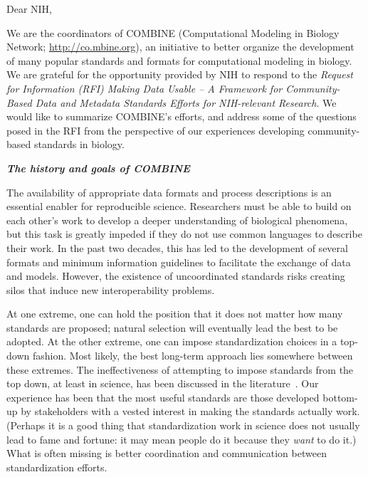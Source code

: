

\newcommand{\eg}{e.g.,\xspace}
\newcommand{\idorg}{\href{http://identifiers.org}{\texttt{Identifiers.org}}\xspace}


Dear NIH,

We are the coordinators of COMBINE (Computational Modeling in Biology Network; \url{http://co.mbine.org}), an initiative to better organize the development of many popular standards and formats for computational modeling in biology.  We are grateful for the opportunity provided by NIH to respond to the \emph{Request for Information (RFI) Making Data Usable -- A Framework for Community-Based Data and Metadata Standards Efforts for NIH-relevant Research}.  We would like to summarize COMBINE's efforts, and address some of the questions posed in the RFI from the perspective of our experiences developing community-based standards in biology.


\textbf{\textsl{The history and goals of COMBINE}}

The availability of appropriate data formats and process descriptions is an essential enabler for reproducible science.  Researchers must be able to build on each other's work to develop a deeper understanding of biological phenomena, but this task is greatly impeded if they do not use common languages to describe their work.  In the past two decades, this has led to the development of several formats and minimum information guidelines to facilitate the exchange of data and models.  However, the existence of uncoordinated standards risks creating silos that induce new interoperability problems.  

At one extreme, one can hold the position that it does not matter how many standards are proposed; natural selection will eventually lead the best to be adopted.  At the other extreme, one can impose standardization choices in a top-down fashion.  Most likely, the best long-term approach lies somewhere between these extremes.  The ineffectiveness of attempting to impose standards from the top down, at least in science, has been discussed in the literature~\cite{quackenbush_2006b}.  Our experience has been that the most useful standards are those developed bottom-up by stakeholders with a vested interest in making the standards actually work.  (Perhaps it is a good thing that standardization work in science does not usually lead to fame and fortune: it may mean people do it because they \emph{want} to do it.)  What is often missing is better coordination and communication between standardization efforts.

